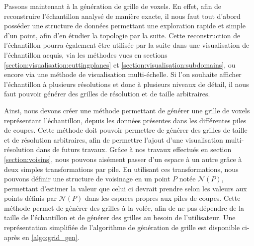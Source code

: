 {{		Passons maintenant à la génération de grille de voxels. En effet, afin de reconstruire l'échantillon analysé de manière exacte, il nous faut tout d'abord posséder une structure de données permettant une exploration rapide et simple d'un point, afin d'en étudier la topologie par la suite. Cette reconstruction de l'échantillon pourra également être utilisée par la suite dans une visualisation de l'échantillon acquis, via les méthodes vues en sections \ref{section:visualisation:cuttingplanes} et \ref{section:visualisation:subdomains}, ou encore via une méthode de visualisation multi-échelle. Si l'on souhaite afficher l'échantillon à plusieurs résolutions et donc à plusieurs niveaux de détail, il nous faut pouvoir générer des grilles de résolution et de taille arbitraires.

		Ainsi, nous devons créer une méthode permettant de générer une grille de voxels représentant l'échantillon, depuis les données présentes dans les différentes piles de coupes. Cette méthode doit pouvoir permettre de générer des grilles de taille et de résolution arbitraires, afin de permettre l'ajout d'une visualisation multi-résolution dans de futurs travaux. Grâce à nos travaux effectués en section \ref{section:voisins}, nous pouvons aisément passer d'un espace à un autre grâce à deux simples transformations par pile. En utilisant ces transformations, nous pouvons définir une structure de voisinage en un point $P$ notée $\mathcal{N}(P)$, permettant d'estimer la valeur que celui ci devrait prendre selon les valeurs aux points définis par $\mathcal{N}(P)$ dans les espaces propres aux piles de coupes. Cette méthode permet de générer des grilles à la volée, afin de ne pas dépendre de la taille de l'échantillon et de générer des grilles au besoin de l'utilisateur. Une représentation simplifiée de l'algorithme de génération de grille est disponible ci-après en \ref{algo:grid_gen}.

}}
